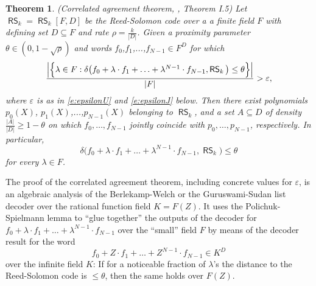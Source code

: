 \documentclass[11pt,article,oneside]{memoir}
\newtheorem{thm}{Theorem}[]
\theoremstyle{definition}
\theoremstyle{remark}
\DeclareMathOperator{\RS}{\mathsf{RS}}
\begin{document}
\begin{thm}
\label{thm:CorrelatedAgreement}
(Correlated agreement theorem, \cite{ProximityGaps}, Theorem I.5)
Let $\RS_k = \RS_k[F,D]$ be the Reed-Solomon code over a a finite field $F$ with defining set $D\subseteq F$ and rate $\rho=\frac{k}{|D|}$.
Given a proximity parameter $\theta\in (0,1-\sqrt\rho)$  and words $f_0$,$f_1$,...,$f_{N-1}\in F^D$ for which
\begin{equation*}
\frac{%
	\Big|\Big\{\lambda\in F : \delta\big(f_0 + \lambda\cdot f_1 + \ldots + \lambda^{N-1}\cdot f_{N-1}, \RS_k\big) \leq \theta \Big\} \Big|
}{|F|} > \varepsilon,
\end{equation*}
where $\varepsilon$ is as in \eqref{e:epsilonU} and \eqref{e:epsilonJ}  below.
Then there exist polynomials $p_0(X)$, $p_1(X)$,...,$p_{N-1}(X)$ belonging to $\RS_k$, and a set $A\subseteq D$ of density 
$
\frac{|A|}{|D|}\geq 1 - \theta
$ 
on which $f_0, \ldots, f_{N-1}$ jointly coincide with $p_0, \ldots, p_{N-1}$, respectively. 
In particular, 
\begin{equation*}
\delta\big(f_0 + \lambda\cdot f_1 + \ldots + \lambda^{N-1}\cdot f_{N-1}, \RS_k\big) \leq \theta
\end{equation*}
for every $\lambda\in F$. 
\end{thm}

The proof of the correlated agreement theorem, including concrete values for $\varepsilon$, is an algebraic analysis of the Berlekamp-Welch or the Guruswami-Sudan list decoder over the rational function field $K=F(Z)$. 
It uses the Polichuk-Spielmann lemma to “glue together” the outputs of the decoder for $f_0 + \lambda\cdot f_1 + \ldots +\lambda^{N-1}\cdot f_{N-1}$ over the “small” field $F$ by means of the decoder result for the word 
\[
f_0 + Z\cdot f_1 + \ldots + Z^{N-1}\cdot f_{N-1} \in K^D
\]
over the infinite field $K$: 
If for a noticeable fraction of  $\lambda$’s the distance to the Reed-Solomon code is $\leq\theta$, then the same holds over $F(Z)$.
\end{document}
